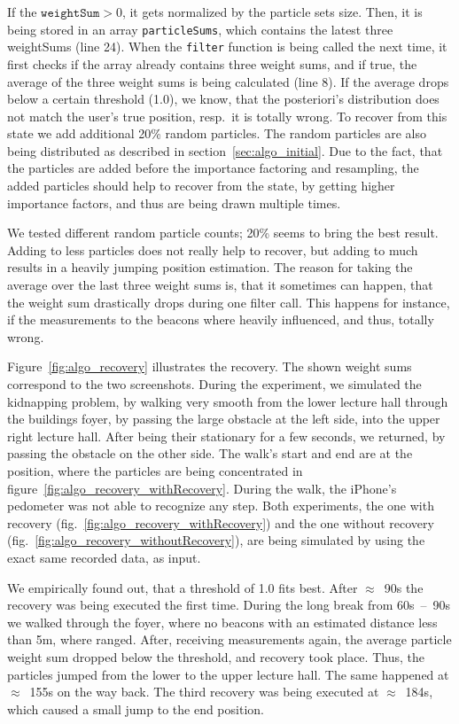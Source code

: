 If the $\texttt{weightSum} > 0$, it gets normalized by the particle sets size. Then, it is being stored in an array \texttt{particleSums}, which contains the latest three weightSums (line 24). When the \texttt{filter} function is being called the next time, it first checks if the array already contains three weight sums, and if true, the average of the three weight sums is being calculated (line 8). If the average drops below a certain threshold (1.0), we know, that the posteriori's distribution does not match the user's true position, resp.\ it is totally wrong. To recover from this state we add additional 20\% random particles. The random particles are also being distributed as described in section~\ref{sec:algo_initial}. Due to the fact, that the particles are added before the importance factoring and resampling, the added particles should help to recover from the state, by getting higher importance factors, and thus are being drawn multiple times.

We tested different random particle counts; 20\% seems to bring the best result. Adding to less particles does not really help to recover, but adding to much results in a heavily jumping position estimation. The reason for taking the average over the last three weight sums is, that it sometimes can happen, that the weight sum drastically drops during one filter call. This happens for instance, if the measurements to the beacons where heavily influenced, and thus, totally wrong.

Figure~\ref{fig:algo_recovery} illustrates the recovery. The shown weight sums correspond to the two screenshots. During the experiment, we simulated the kidnapping problem, by walking very smooth from the lower lecture hall through the buildings foyer, by passing the large obstacle at the left side, into the upper right lecture hall. After being their stationary for a few seconds, we returned, by passing the obstacle on the other side. The walk's start and end are at the position, where the particles are being concentrated in figure~\ref{fig:algo_recovery_withRecovery}. During the walk, the iPhone's pedometer was not able to recognize any step. Both experiments, the one with recovery (fig.~\ref{fig:algo_recovery_withRecovery}) and the one without recovery (fig.~\ref{fig:algo_recovery_withoutRecovery}), are being simulated by using the exact same recorded data, as input.

We empirically found out, that a threshold of 1.0 fits best. After $\approx$~90s the recovery was being executed the first time. During the long break from 60s~--~90s we walked through the foyer, where no beacons with an estimated distance less than 5m, where ranged. After, receiving measurements again, the average particle weight sum dropped below the threshold, and recovery took place. Thus, the particles jumped from the lower to the upper lecture hall. The same happened at $\approx$~155s on the way back. The third recovery was being executed at $\approx$~184s, which caused a small jump to the end position.

